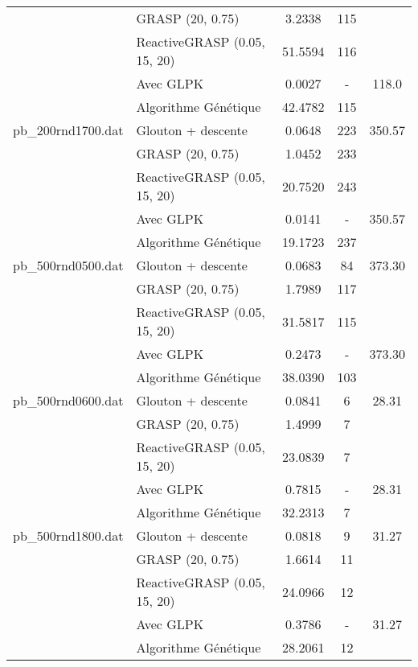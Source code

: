 \begin{minipage}
\begin{longtable}{|l|l|c|c|c|}
                   & GRASP (20, 0.75) & 3.2338 & 115 & \\
                   & ReactiveGRASP (0.05, 15, 20) & 51.5594 & 116 & \\
                   & Avec GLPK & 0.0027 & - & 118.0 \\
                   & Algorithme Génétique & 42.4782 & 115 & \\
\hline
pb\_200rnd1700.dat & Glouton + descente & 0.0648 & 223 & 350.57 \\
                   & GRASP (20, 0.75) & 1.0452 & 233 & \\
                   & ReactiveGRASP (0.05, 15, 20) & 20.7520 & 243 & \\
                   & Avec GLPK & 0.0141 & - & 350.57 \\
                   & Algorithme Génétique & 19.1723 & 237 & \\
\hline
pb\_500rnd0500.dat & Glouton + descente & 0.0683 & 84 & 373.30 \\
                   & GRASP (20, 0.75) & 1.7989 & 117 & \\
                   & ReactiveGRASP (0.05, 15, 20) & 31.5817 & 115 & \\
                   & Avec GLPK & 0.2473 & - & 373.30 \\
                   & Algorithme Génétique & 38.0390 & 103 & \\
\hline
pb\_500rnd0600.dat & Glouton + descente & 0.0841 & 6 & 28.31 \\
                   & GRASP (20, 0.75) & 1.4999 & 7 & \\
                   & ReactiveGRASP (0.05, 15, 20) & 23.0839 & 7 & \\
                   & Avec GLPK & 0.7815 & - & 28.31 \\
                   & Algorithme Génétique & 32.2313 & 7 & \\
\hline
pb\_500rnd1800.dat & Glouton + descente & 0.0818 & 9 & 31.27 \\
                   & GRASP (20, 0.75) & 1.6614 & 11 & \\
                   & ReactiveGRASP (0.05, 15, 20) & 24.0966 & 12 & \\
                   & Avec GLPK & 0.3786 & - & 31.27 \\
                   & Algorithme Génétique & 28.2061 & 12 & \\
\hline

\end{longtable}



\end{minipage}
